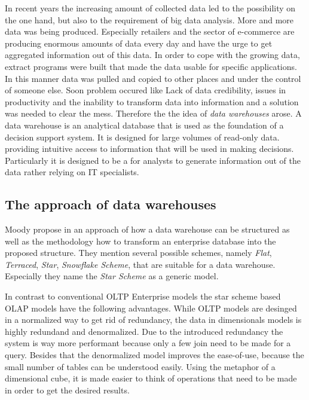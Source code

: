 In recent years the increasing amount of collected data led to the possibility on the one hand, but also to the requirement of big data analysis.
More and more data was being produced. Especially retailers and the sector of e-commerce are producing enormous amounts of data every day and have the urge to get aggregated information out of this data.
In order to cope with the growing data, extract programs were built that made the data usable for specific applications.
In this manner data was pulled and copied to other places and under the control of someone else.
Soon problem occured like Lack of data credibility, issues in productivity and the inability to transform data into information and a solution was needed to clear the mess.
Therefore the the idea of \emph{data warehouses} arose.
A data warehouse is an analytical database that is used as the foundation of a decision support system.
It is designed for large volumes of read-only data. providing intuitive access to information that will be used in making decisions.
Particularly it is designed to be a  for analysts to generate information out of the data rather relying on IT specialists.

\subsection{The approach of data warehouses}

Moody \andothers propose in \cite{moody2000enterprise} an approach of how a data warehouse can be structured as well as the methodology how to transform an enterprise database into the proposed structure.
They mention several possible schemes, namely \emph{Flat}, \emph{Terraced}, \emph{Star}, \emph{Snowflake Scheme}, that are suitable for a data warehouse.
Especially they name the \emph{Star Scheme} as a generic model.

In contrast to conventional OLTP Enterprise models the star scheme based OLAP models have the following advantages.
While OLTP models are desinged in a normalized way to get rid of redundancy, the data in dimensionals models is highly redundand and denormalized.
Due to the introduced redundancy the system is way more performant because only a few join need to be made for a query.
Besides that the denormalized model improves the ease-of-use, because the small number of tables can be understood easily.
Using the metaphor of a dimensional cube, it is made easier to think of operations that need to be made in order to get the desired results.

